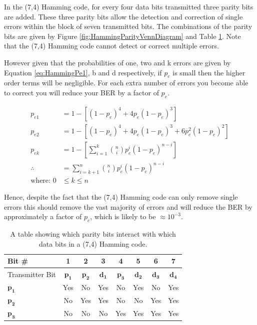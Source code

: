 \documentclass[12pt,onecolumn,letterpaper]{article}
\begin{document}
In the (7,4) Hamming code, for every four data bits transmitted three parity bits are added. These three parity bits allow the detection and correction of single errors within the block of seven transmitted bits. The combinations of the parity bits are given by Figure \ref{fig:HammingParityVennDiagram} and Table \ref{tab:Hamming74Parity}. Note that the (7,4) Hamming code cannot detect or correct multiple errors. 

However given that the probabilities of one, two and k errors are given by Equation \ref{eq:HammingPe1}, b and d respectively, if $p_e$ is small then the higher order terms will be negligible. For each extra number of errors you become able to correct you will reduce your BER by a factor of $p_e$.

\begin{subequations}
\begin{align}
   p_{e1} &= 1 - \left[(1-p_e)^{4} + 4p_e(1-p_e)^{3} \right] \label{eq:HammingPe1} \\
   p_{e2} &= 1 - \left[ (1-p_e)^{4} + 4p_e(1-p_e)^{3} + 6p_e^2(1-p_e)^{2} \right] \label{eq:HammingPe2} \\
   p_{ek} &= 1 - \left[ \sum_{i=1}^{k}{n \choose i}p_e^i(1-p_e)^{n-i} \right] \\
   \therefore &= \sum_{i=k+1}^{n}{n \choose i}p_e^i(1-p_e)^{n-i}  
   \label{eq:HammingPeN} \\
   \mbox{where: }0 &\leq k \leq n 
\end{align}
\end{subequations}

Hence, despite the fact that the (7,4) Hamming code can only remove single errors this should remove the vast majority of errors and will reduce the BER by approximately a factor of $p_e$, which is likely to be $\approx10^{-3}$.

\begin{table}[H]
   \begin{center}
   \begin{tabular}{|l|c|c|c|c|c|c|c|}
   \hline
   Bit \# & 1 & 2 & 3 & 4 & 5 & 6 & 7 \\
   \hline\hline
   Transmitter Bit & $\mathbf{p_1}$ & $\mathbf{p_2}$ & $\mathbf{d_1}$ & $\mathbf{p_3}$ & $\mathbf{d_2}$ & $\mathbf{d_3}$ & $\mathbf{d_4}$ \\
   \hline
   $\mathbf{p_1}$ & \cellcolor{green}Yes & \cellcolor{red}No & \cellcolor{green}Yes & \cellcolor{red}No & \cellcolor{green}Yes & \cellcolor{red}No & \cellcolor{green}Yes \\
   $\mathbf{p_2}$ & \cellcolor{red}No & \cellcolor{green}Yes & \cellcolor{green}Yes & \cellcolor{red}No & \cellcolor{red}No & \cellcolor{green}Yes & \cellcolor{green}Yes \\
   $\mathbf{p_3}$ & \cellcolor{red}No & \cellcolor{red}No & \cellcolor{red}No & \cellcolor{green}Yes & \cellcolor{green}Yes & \cellcolor{green}Yes & \cellcolor{green}Yes \\
   \hline
   \end{tabular}
   \end{center}
   \caption{A table showing which parity bits interact with which data bits in a (7,4) Hamming code.}
   \label{tab:Hamming74Parity}
\end{table}
   
\end{document}
